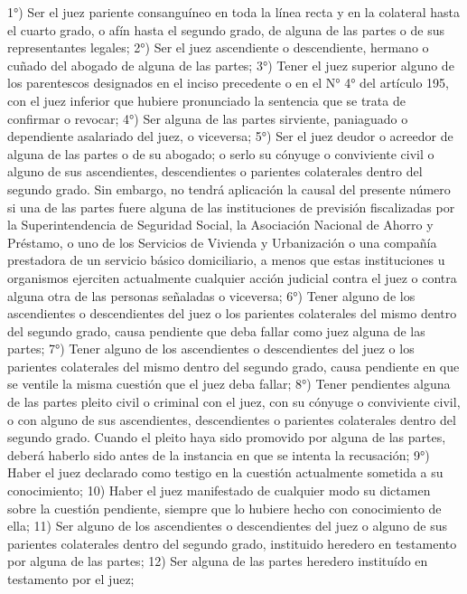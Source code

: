     1°) Ser el juez pariente consanguíneo en toda la línea recta y en la colateral hasta el cuarto grado, o afín hasta el segundo grado, de alguna de las partes o de sus representantes legales;
    2°) Ser el juez ascendiente o descendiente, hermano o cuñado del abogado de alguna de las partes;
    3°) Tener el juez superior alguno de los parentescos designados en el inciso precedente o en el N° 4° del artículo 195, con el juez inferior que hubiere pronunciado la sentencia que se trata de confirmar o revocar;
    4°) Ser alguna de las partes sirviente, paniaguado o dependiente asalariado del juez, o viceversa;
    5°) Ser el juez deudor o acreedor de alguna de las partes o de su abogado; o serlo su cónyuge o conviviente civil o alguno de sus ascendientes, descendientes o parientes colaterales dentro del segundo grado.
    Sin embargo, no tendrá aplicación la causal del presente número si una de las partes fuere alguna de las instituciones de previsión fiscalizadas por la Superintendencia de Seguridad Social, la Asociación Nacional de Ahorro y Préstamo, o uno de los Servicios de Vivienda y Urbanización o una compañía prestadora de un servicio básico domiciliario, a menos que estas instituciones u organismos ejerciten actualmente cualquier acción judicial contra el juez o contra alguna otra de las personas señaladas o viceversa;
    6°) Tener alguno de los ascendientes o descendientes del juez o los parientes colaterales del mismo dentro del segundo grado, causa pendiente que deba fallar como juez alguna de las partes;
    7°) Tener alguno de los ascendientes o descendientes del juez o los parientes colaterales del mismo dentro del segundo grado, causa pendiente en que se ventile la misma cuestión que el juez deba fallar;
    8°) Tener pendientes alguna de las partes pleito civil o criminal con el juez, con su cónyuge o conviviente civil, o con alguno de sus ascendientes, descendientes o parientes colaterales dentro del segundo grado.
    Cuando el pleito haya sido promovido por alguna de las partes, deberá haberlo sido antes de la instancia en que se intenta la recusación;
    9°) Haber el juez declarado como testigo en la cuestión actualmente sometida a su conocimiento;
    10) Haber el juez manifestado de cualquier modo su dictamen sobre la cuestión pendiente, siempre que lo hubiere hecho con conocimiento de ella;
    11) Ser alguno de los ascendientes o descendientes del juez o alguno de sus parientes colaterales dentro del segundo grado, instituido heredero en testamento por alguna de las partes;
    12) Ser alguna de las partes heredero instituído en testamento por el juez;
